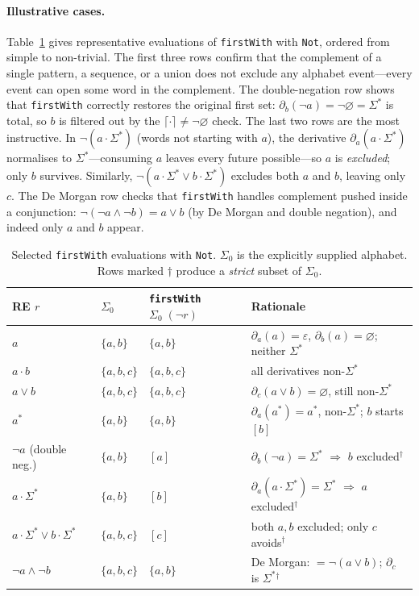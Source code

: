 \documentclass[acmsmall,screen]{acmart}
\newcommand{\univ}{\neg\varnothing}
\begin{document}
\paragraph{Illustrative cases.}
Table~\ref{tab:firstwith-not} gives representative evaluations of
\lstinline{firstWith} with \lstinline{Not}, ordered from simple to
non-trivial.
The first three rows confirm that the complement of a single pattern,
a sequence, or a union does not exclude any alphabet event---every event
can open some word in the complement.
The double-negation row shows that \lstinline{firstWith} correctly restores
the original first set: $\partial_b(\neg a) = \neg\varnothing = \Sigma^*$
is total, so $b$ is filtered out by the $\lceil\cdot\rceil \neq \univ$
check.
The last two rows are the most instructive.
In $\neg(a \cdot \Sigma^*)$ (words not starting with $a$), the derivative
$\partial_a(a \cdot \Sigma^*)$ normalises to $\Sigma^*$---consuming $a$
leaves every future possible---so $a$ is \emph{excluded}; only $b$ survives.
Similarly, $\neg(a\cdot\Sigma^* \vee b\cdot\Sigma^*)$ excludes both $a$
and $b$, leaving only $c$.
The De Morgan row checks that \lstinline{firstWith} handles complement
pushed inside a conjunction: $\neg(\neg a \wedge \neg b) = a \vee b$
(by De Morgan and double negation), and indeed only $a$ and $b$ appear.

\begin{table}[h]
\caption{Selected \lstinline{firstWith} evaluations with \lstinline{Not}.
         $\Sigma_0$ is the explicitly supplied alphabet.
         Rows marked $\dagger$ produce a \emph{strict} subset of $\Sigma_0$.}
\label{tab:firstwith-not}
\begin{tabular}{llll}
\toprule
RE $r$ & $\Sigma_0$ & \lstinline{firstWith} $\Sigma_0\;(\neg r)$ & Rationale \\
\midrule
$a$                     & $\{a,b\}$   & $\{a,b\}$  & $\partial_a(a)=\varepsilon$, $\partial_b(a)=\varnothing$; neither $\Sigma^*$ \\
$a \cdot b$             & $\{a,b,c\}$ & $\{a,b,c\}$ & all derivatives non-$\Sigma^*$ \\
$a \vee b$              & $\{a,b,c\}$ & $\{a,b,c\}$ & $\partial_c(a\vee b)=\varnothing$, still non-$\Sigma^*$ \\
$a^*$                   & $\{a,b\}$   & $\{a,b\}$  & $\partial_a(a^*)=a^*$, non-$\Sigma^*$; $b$ starts $[b]$ \\
$\neg a$ (double neg.)  & $\{a,b\}$   & $[a]$      & $\partial_b(\neg a)=\Sigma^*$ $\Rightarrow$ $b$ excluded$^\dagger$ \\
$a \cdot \Sigma^*$      & $\{a,b\}$   & $[b]$      & $\partial_a(a\cdot\Sigma^*)=\Sigma^*$ $\Rightarrow$ $a$ excluded$^\dagger$ \\
$a\cdot\Sigma^*\vee b\cdot\Sigma^*$ & $\{a,b,c\}$ & $[c]$ & both $a,b$ excluded; only $c$ avoids$^\dagger$ \\
$\neg a \wedge \neg b$  & $\{a,b,c\}$ & $\{a,b\}$  & De Morgan: $=\neg(a\vee b)$; $\partial_c$ is $\Sigma^*$$^\dagger$ \\
\bottomrule
\end{tabular}
\end{table}
\end{document}
